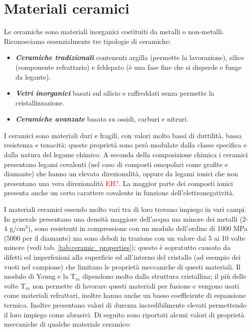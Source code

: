 \newpage

\section{Materiali ceramici}

Le ceramiche sono materiali inorganici costituiti da metalli o non-metalli. Riconosciamo essenzialmente tre tipologie di ceramiche:

\begin{itemize}
    \item \textbf{\textit{Ceramiche tradizionali}} contenenti argilla (permette la lavorazione), silice (componente refrattario) e feldspato (è una fase fine che si disperde e funge da legante).
    \item \textbf{\textit{Vetri inorganici}} basati sul silicio e raffreddati senza permette la cristallizzazione.
    \item \textbf{\textit{Ceramiche avanzate}} basata su ossidi, carburi e nitruri.
\end{itemize}

I ceramici sono materiali duri e fragili, con valori molto bassi di duttilità, bassa resistenza e tenacità; queste proprietà sono però modulate dalla classe specifica e dalla natura del legame chimico. A seconda della composizione chimica i ceramici presentano legami covalenti (nel caso di composti omopolari come grafite e diamante) che hanno un elevata direzionalità, oppure da legami ionici che non presentano una vera direzionalità \textcolor{red}{EH?}. La maggior parte dei composti ionici presenta anche un certo carattere covalente in funzione dell'elettronegatività.

I materiali ceramici essendo molto vari tra di loro trovano impiego in vari campi. In generale presentano una densità maggiore dell'acqua ma minore dei metalli (2-4 g/cm$^3$), sono resistenti in compressione con un modulo dell'ordine di 1000 MPa (5000 per il diamante) ma sono deboli in trazione con un valore dai 5 ai 10 volte minore (vedi tab. \ref{tab:ceramic_properties}); questo è sopratutto causato da difetti ed imperfezioni alla superficie ed all'interno del cristallo (ad esempio dei vuoti nel campione) che limitano le proprietà meccaniche di questi materiali. Il modulo di Young e la T$_m$ dipendono molto dalla struttura cristallina; il più delle volte T$_m$ non permette di lavorare questi materiali per fusione e vengono usati come materiali refrattari, inoltre hanno anche un basso coefficiente di espansione termica. Inoltre presentano valori di durezza incredibilmente elevati permettendo il loro impiego come abrasivi. Di seguito sono riportati alcuni valori di proprietà meccaniche di qualche materiale ceramico:

